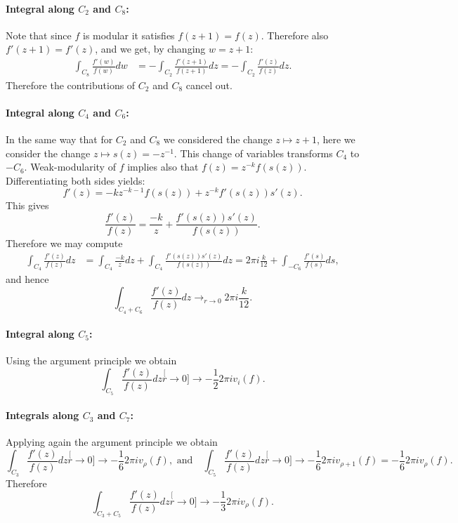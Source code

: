 \paragraph{Integral along $C_2$ and $C_8$:} Note that since $f$ is modular it satisfies $f(z+1)=f(z)$. Therefore also $f'(z+1)=f'(z)$, and we get, by changing $w=z+1$:
\begin{align*}
\int_{C_8}\frac{f'(w)}{f(w)}dw &= -\int_{C_2}\frac{f'(z+1)}{f(z+1)}dz = -\int_{C_2}\frac{f'(z)}{f(z)}dz.
\end{align*}
Therefore the contributions of $C_2$ and $C_8$ cancel out.

\paragraph{Integral along $C_4$ and $C_6$:} In the same way that for $C_2$ and $C_8$ we considered the change $z\mapsto z+1$, here we consider the change $z\mapsto s(z)=-z^{-1}$. This change of variables transforms $C_4$ to $-C_6$. Weak-modularity of $f$ implies also that $f(z) = z^{-k}f(s(z))$. Differentiating both sides yields:
\[
f'(z) = -kz^{-k-1}f(s(z)) + z^{-k}f'(s(z))s'(z).%
\]
This gives
\[
\frac{f'(z)}{f(z)} = \frac{-k}{z} + \frac{f'(s(z))s'(z)}{f(s(z))}.
\]
Therefore we may compute
\begin{align*}
\int_{C_4}\frac{f'(z)}{f(z)}dz &=\int_{C_4} \frac{-k}{z}dz + \int_{C_4}\frac{f'(s(z))s'(z)}{f(s(z))}dz =2\pi i\frac{k}{12} +\int_{-C_6}\frac{f'(s)}{f(s)}ds,
\end{align*}
and hence
\[
\int_{C_4+C_6}\frac{f'(z)}{f(z)}dz \to_{r\to 0} 2\pi i\frac{k}{12}.
\]

\paragraph{Integral along $C_5$:} Using the argument principle we obtain
\[
\int_{C_5} \frac{f'(z)}{f(z)}dz \stackrel[r\to 0]{}\longrightarrow -\frac 12 2\pi i v_i(f).
\]

\paragraph{Integrals along $C_3$ and $C_7$:} Applying again the argument principle we obtain
\[
\int_{C_3} \frac{f'(z)}{f(z)}dz \stackrel[r\to 0]{}\longrightarrow -\frac 16 2\pi i v_\rho(f),\text{ and}\quad
\int_{C_5} \frac{f'(z)}{f(z)}dz \stackrel[r\to 0]{}\longrightarrow -\frac 16 2\pi i v_{\rho+1}(f)=-\frac{1}{6}2\pi i v_\rho(f).
\]
Therefore
\[
\int_{C_3+C_5} \frac{f'(z)}{f(z)}dz \stackrel[r\to 0]{}\longrightarrow -\frac{1}{3}2\pi i v_\rho(f).
\]

